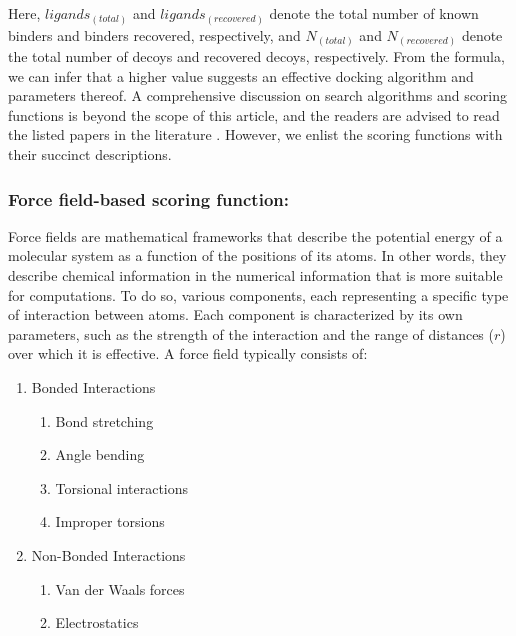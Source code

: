 \documentclass[10pt,letterpaper]{article}
\begin{document}
{{Here, $ligands_{(total)}$ and $ligands_{(recovered)}$ denote the total number of known binders and binders recovered, respectively, and $N_{(total)}$ and $N_{(recovered)}$ denote the total number of decoys and recovered decoys, respectively. From the formula, we can infer that a higher value suggests an effective docking algorithm and parameters thereof. A comprehensive discussion on search algorithms and scoring functions is beyond the scope of this article, and the readers are advised to read the listed papers in the literature \cite{bib5, bib6}. However, we enlist the scoring functions with their succinct descriptions. 

\subsubsection*{Force field-based scoring function:}

Force fields\cite{bib28} are mathematical frameworks that describe the potential energy of a molecular system as a function of the positions of its atoms. In other words, they describe chemical information in the numerical information that is more suitable for computations. To do so, various components, each representing a specific type of interaction between atoms. Each component is characterized by its own parameters, such as the strength of the interaction and the range of distances ($r$) over which it is effective.
A force field typically consists of:
\begin{enumerate}
    \item Bonded Interactions
        \begin{enumerate}
	       \item Bond stretching
	       \item Angle bending
	       \item Torsional interactions
	       \item Improper torsions
        \end{enumerate}
    \item Non-Bonded Interactions
        \begin{enumerate}
	       \item Van der Waals forces
	       \item Electrostatics
        \end{enumerate}
\end{enumerate}

}}
\end{document}
